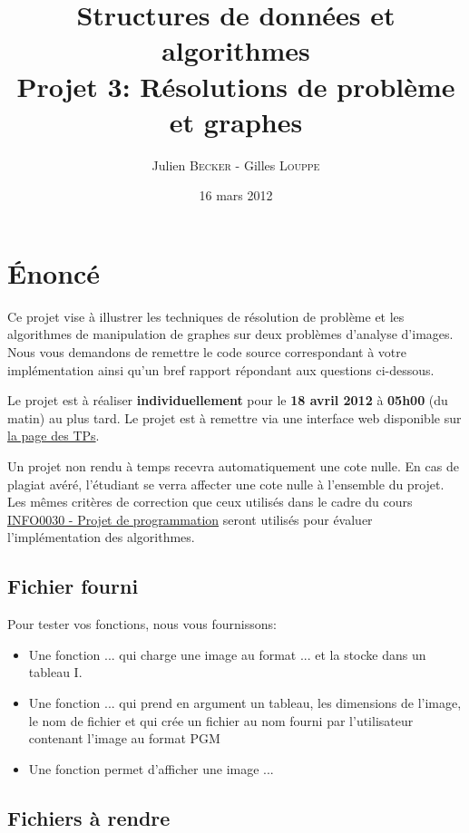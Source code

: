 \documentclass[a4paper,10pt]{article}
\title{
    \textbf{Structures de données et algorithmes}\\
    Projet 3: Résolutions de problème et graphes
}
\author{Julien \textsc{Becker} - Gilles \textsc{Louppe}}
\date{16 mars 2012}
\begin{document}
\maketitle

\section*{\'Enoncé}

Ce projet vise à illustrer les techniques de résolution de problème et
les algorithmes de manipulation de graphes sur deux problèmes
d'analyse d'images. Nous vous demandons de remettre le code source
correspondant à votre implémentation ainsi qu'un bref rapport
répondant aux questions ci-dessous.

Le projet est à réaliser {\bf individuellement} pour le {\bf 18 avril
  2012} à {\bf 05h00} (du matin) au plus tard. Le projet est à
remettre via une interface web disponible sur
\href{http://www.montefiore.ulg.ac.be/~glouppe/2011-2012/students.info0902.php}{la
  page des TPs}.

Un projet non rendu à temps recevra automatiquement une cote nulle. En
cas de plagiat avéré, l'étudiant se verra affecter une cote nulle à
l'ensemble du projet. Les mêmes critères de correction que ceux
utilisés dans le cadre du cours
\href{http://www.montefiore.ulg.ac.be/~info0030/}{INFO0030 - Projet de
  programmation} seront utilisés pour évaluer l'implémentation des
algorithmes.

\subsection*{Fichier fourni}

Pour tester vos fonctions, nous vous fournissons:
\begin{itemize}
\item Une fonction ... qui charge une image au format ... et la stocke dans un tableau I.
\item Une fonction ... qui prend en argument un tableau, les dimensions de l'image, le nom de fichier et qui crée un fichier au nom fourni par l'utilisateur contenant l'image au format PGM
\item Une fonction permet d'afficher une image ...
\end{itemize}

\subsection*{Fichiers à rendre}
\end{document}
